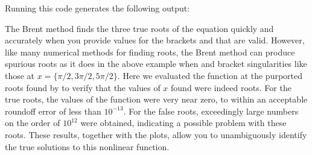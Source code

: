 \documentclass[letterpaper,10pt,english]{sphinxmanual}
\begin{document}
\begin{sphinxVerbatim}[commandchars=\\\{\},numbers=left,firstnumber=1,stepnumber=1]
    
    
              
\end{sphinxVerbatim}

\sphinxAtStartPar
Running this code generates the following output:

\begin{sphinxVerbatim}[commandchars=\\\{\},numbers=left,firstnumber=1,stepnumber=1]
 


\end{sphinxVerbatim}

\sphinxAtStartPar
The Brent method finds the three true roots of the equation quickly and accurately when you provide values for the brackets  and  that are valid.  However, like many numerical methods for finding roots, the Brent method can produce spurious roots as it does in the above example when  and  bracket singularities like those at \(x = \{\pi/2, 3\pi/2, 5\pi/2\}\).  Here we evaluated the function at the purported roots found by  to verify that the values of \(x\) found were indeed roots.  For the true roots, the values of the function were very near zero, to within an acceptable roundoff error of less than \(10^{-13}\).  For the false roots, exceedingly large numbers on the order of  \(10^{12}\) were obtained, indicating a possible problem with these roots.  These results, together with the plots, allow you to unambiguously identify the true solutions to this nonlinear function.
\end{document}

